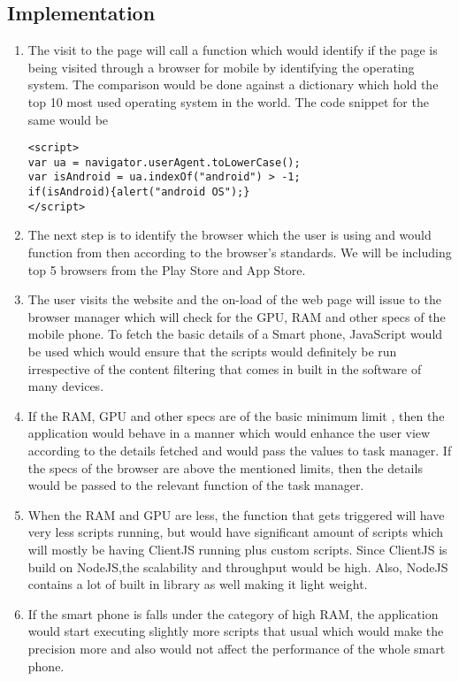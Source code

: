 \documentclass[journal]{IEEEtran}
\begin{document}
\subsection{Implementation}
\begin{enumerate}
  \item The visit to the page will call a function which would identify if the page is being visited through a browser for mobile by identifying the operating system. The comparison would be done against a dictionary which hold the top 10 most used operating system in the world. The code snippet for the same would be
  
\begin{verbatim}
<script>
var ua = navigator.userAgent.toLowerCase();
var isAndroid = ua.indexOf("android") > -1;
if(isAndroid){alert("android OS");}
</script>
\end{verbatim}
  \item The next step is to identify the browser which the user is using and would function from then according to the browser's standards. We will be including top 5 browsers from the Play Store and App Store. 
  \item The user visits the website and the on-load of the web page will issue to the
  browser manager which will check for the GPU, RAM and other specs of the mobile phone.
  To fetch the basic details of a Smart phone, JavaScript would be used which would
  ensure that the scripts would definitely be run irrespective of the content filtering
  that comes in built in the software of many devices.
  \item If the RAM, GPU and other specs are of the basic minimum limit , then the
  application would behave in a manner which would enhance the user view according to the  details fetched and would pass the values to task manager. If the specs of the browser
  are above the mentioned limits, then the details would be passed to the relevant
  function of the task manager. 
  \item When the RAM and GPU are less, the function that gets triggered will have very less scripts running, but would have significant amount of scripts which will mostly be having ClientJS running plus custom scripts. Since ClientJS is build on NodeJS,the scalability and throughput would be high. Also, NodeJS contains a lot of built in library as well making it light weight. 
  \item If the smart phone is falls under the category of high RAM, the application would start executing slightly more scripts that usual which would make the precision more and also would not affect the performance of the whole smart phone. 

\end{enumerate}
\end{document}

